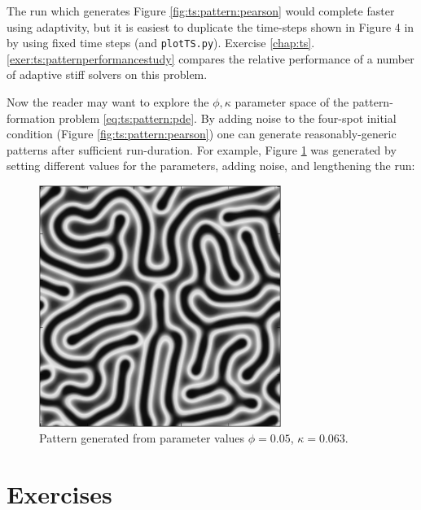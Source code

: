The run which generates Figure \ref{fig:ts:pattern:pearson} would complete faster using adaptivity, but it is easiest to duplicate the time-steps shown in Figure 4 in \citet{Pearson1993} by using fixed time steps (and \texttt{plotTS.py}).  Exercise \ref{chap:ts}.\ref{exer:ts:patternperformancestudy} compares the relative performance of a number of adaptive stiff solvers on this problem.

Now the reader may want to explore the $\phi,\kappa$ parameter space of the pattern-formation problem \eqref{eq:ts:pattern:pde}.  By adding noise to the four-spot initial condition (Figure \ref{fig:ts:pattern:pearson}) one can generate reasonably-generic patterns after sufficient run-duration.  For example, Figure \ref{fig:ts:pattern:snakes} was generated by setting different values for the parameters, adding noise, and lengthening the run:

\begin{figure}
\includegraphics[width=0.7\textwidth]{figs/snakes}
\caption{Pattern generated from parameter values $\phi=0.05$, $\kappa=0.063$.}
\label{fig:ts:pattern:snakes}
\end{figure}


\section{Exercises}


